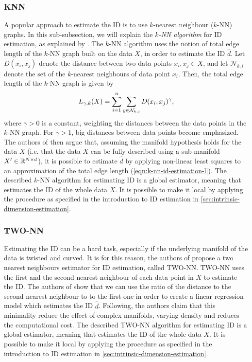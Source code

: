 \subsubsection{KNN}
\label{sec:id-estimation-knn}
A popular approach to estimate the ID is to use $k$-nearest neighbour ($k$-NN) graphs. In this sub-subsection, we will explain the \textit{$k$-NN algorithm} for ID estimation, as explained by \cite[p. 651]{Carter2010}. The $k$-NN algorithm uses the notion of total edge length of the $k$-NN graph built on the data $X$, in order to estimate the ID $\hat{d}$. Let $D(x_i, x_j)$ denote the distance between two data points $x_i, x_j \in X$, and let $\mathcal{N}_{k, i}$ denote the set of the $k$-nearest neighbours of data point $x_i$. Then, the total edge length of the $k$-NN graph is given by
\begin{align}
    L_{\gamma, k}(X) = \sum\limits_{i=1}^{n} \sum\limits_{y \in \mathcal{N}_{k, i}}^{} D(x_i, x_j)^\gamma,
    \label{eqn:k-nn-id-estimation-l}
\end{align}
where $\gamma>0$ is a constant, weighting the distances between the data points in the $k$-NN graph. For $\gamma>1$, big distances between data points become emphasized. The authors of \cite[p. 651]{Carter2010} then argue that, assuming the manifold hypothesis holds for the data $X$ (i.e. that the data $X$ can be fully described using a sub-manifold $X' \in \mathbb{R}^{N \times d}$), it is possible to estimate $\hat{d}$ by applying non-linear least squares to an approximation of the total edge length (\cref{eqn:k-nn-id-estimation-l}). The described $k$-NN algorithm for estimating ID is a global estimator, meaning that estimates the ID of the whole data $X$. It is possible to make it local by applying the procedure as specified in the introduction to ID estimation in \cref{sec:intrinsic-dimension-estimation}. 

\subsubsection{TWO-NN}
\label{sec:id-estimation-twonn}
Estimating the ID can be a hard task, especially if the underlying manifold of the data is twisted and curved. It is for this reason, the authors of \cite{Facco2017twonn} propose a two nearest neighbours estimator for ID estimation, called TWO-NN. TWO-NN uses the first and the second nearest neighbour of each data point in $X$ to estimate the ID. The authors of \cite{Facco2017twonn} show that we can use the ratio of the distance to the second nearest neighbour to to the first one in order to create a linear regression model which estimates the ID $\hat{d}$. Following, the authors claim that this minimality reduce the effect of complex manifolds, varying density and reduces the computational cost. The described TWO-NN algorithm for estimating ID is a global estimator, meaning that estimates the ID of the whole data $X$. It is possible to make it local by applying the procedure as specified in the introduction to ID estimation in \cref{sec:intrinsic-dimension-estimation}. 

